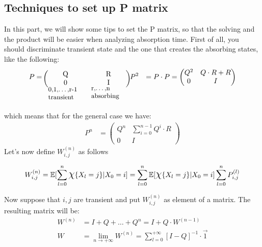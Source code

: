 \subsection{Techniques to set up P matrix}
In this part, we will show some tips to set the P matrix, so that the solving and the product
will be easier when analyzing absorption time. First of all, you should discriminate
transient state and the one that creates the absorbing states, like the following:
\begin{equation} \begin{split}
	P&=\raisebox{-1\baselineskip}{\begin{blockarray}{cc}
      \begin{block}{(cc)}
          Q  & R \\
          0  & I \\
      \end{block}
			\parbox[c]{1.7cm}{\small 0,1,\dots,r-1 \text{transient}} & \parbox[c]{1.7cm}{\small r,\dots,n \text{absorbing}}
    \end{blockarray}}
	P^2 &= P \cdot P = \begin{pmatrix}
	Q^2 & Q \cdot R + R \\
	0 & I
	\end{pmatrix}	\\
\end{split}\end{equation}
which means that for the general case we have:
\begin{equation} \begin{split}
	P^n &= \begin{pmatrix}
	Q^n & \sum\limits_{i=0}^{n-1}Q^i \cdot R \\
	0 & I
	\end{pmatrix}
\end{split}\end{equation}
Let's now define $W_{i,j}^{(n)}$ as follows
\begin{definition}
	\begin{equation}
		W_{i,j}^{(n)} = \mathbb{E}[\sum\limits_{l=0}^n \mbox{\Large $\chi$} \{ X_l=j\}|X_0=i] = \sum\limits_{l=0}^n\mathbb{E}[\mbox{\Large $\chi$} \{ X_l=j\}|X_0=i]\sum\limits_{l=0}^n P_{i,j}^{(l)}
	\end{equation}
\end{definition}
Now suppose that $i,j$ are transient and put $W_{i,j}^{(n)}$ as element of a matrix. The resulting matrix will be:
\begin{equation}\begin{split}
	W^{(n)} &= I + Q + \dots + Q^n = I + Q \cdot W^{(n-1)} \\
	W &= \lim_{n \to +\infty} W^{(n)} = \sum\limits_{l=0}^{+\infty} [I-Q]^{-1} \cdot \vec{1}
\end{split}\end{equation}
